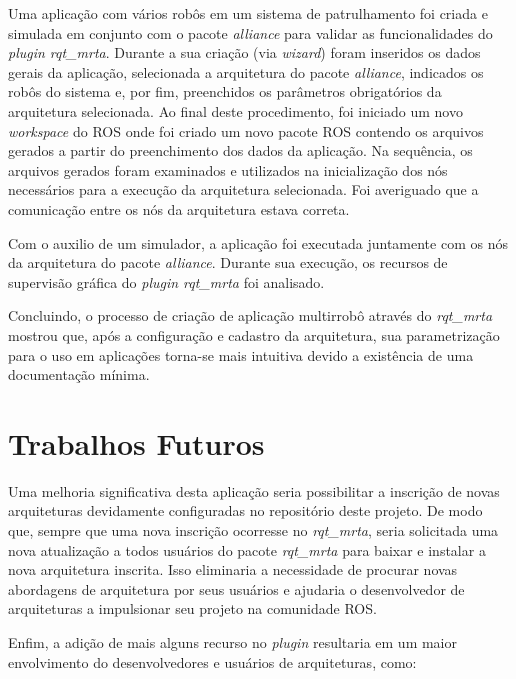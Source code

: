         Uma aplicação com vários robôs em um sistema de patrulhamento foi criada e simulada em conjunto com o pacote \textit{alliance} para validar as funcionalidades do \textit{plugin rqt\_mrta}. Durante a sua criação (via \textit{wizard}) foram inseridos os dados gerais da aplicação, selecionada a arquitetura do pacote \textit{alliance}, indicados os robôs do sistema e, por fim, preenchidos os parâmetros obrigatórios da arquitetura selecionada. Ao final deste procedimento, foi iniciado um novo \textit{workspace} do ROS onde foi criado um novo pacote ROS contendo os arquivos gerados a partir do preenchimento dos dados da aplicação. Na sequência, os arquivos gerados foram examinados e utilizados na inicialização dos nós necessários para a execução da arquitetura selecionada. Foi averiguado que a comunicação entre os nós da arquitetura estava correta.
        
        Com o auxilio de um simulador, a aplicação foi executada juntamente com os nós da arquitetura do pacote \textit{alliance}. Durante sua execução, os recursos de supervisão gráfica do \textit{plugin rqt\_mrta} foi analisado.
        
        Concluindo, o processo de criação de aplicação multirrobô através do \textit{rqt\_mrta} mostrou que, após a configuração e cadastro da arquitetura, sua parametrização para o uso em aplicações torna-se mais intuitiva devido a existência de uma documentação mínima. %
        
    \section{Trabalhos Futuros}
        Uma melhoria significativa desta aplicação seria possibilitar a inscrição de novas arquiteturas devidamente configuradas no repositório deste projeto. De modo que, sempre que uma nova inscrição ocorresse no \textit{rqt\_mrta}, seria solicitada uma nova atualização a todos usuários do pacote \textit{rqt\_mrta} para baixar e instalar a nova arquitetura inscrita. Isso eliminaria a necessidade de procurar novas abordagens de arquitetura por seus usuários e ajudaria o desenvolvedor de arquiteturas a impulsionar seu projeto na comunidade ROS.
        
        Enfim, a adição de mais alguns recurso no \textit{plugin} resultaria em um maior envolvimento do desenvolvedores e usuários de arquiteturas, como:
        
